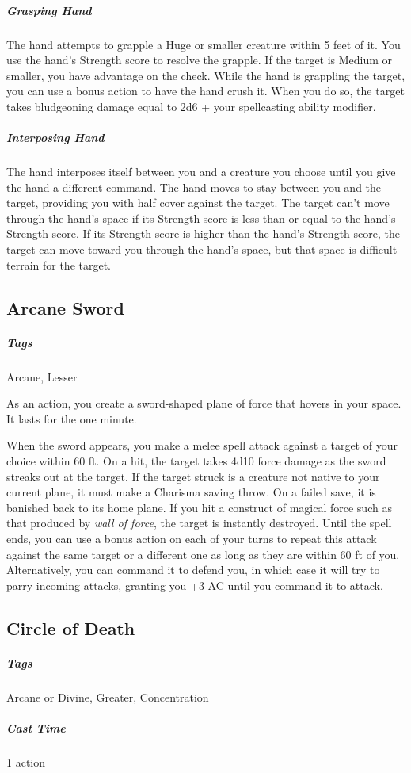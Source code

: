 \subparagraph*{Grasping Hand} The hand attempts to grapple a Huge or smaller creature within 5 feet of it. You use the hand's Strength score to resolve the grapple. If the target is Medium or smaller, you have advantage on the check. While the hand is grappling the target, you can use a bonus action to have the hand crush it. When you do so, the target takes bludgeoning damage equal to 2d6 + your spellcasting ability modifier.

\subparagraph*{Interposing Hand} The hand interposes itself between you and a creature you choose until you give the hand a different command. The hand moves to stay between you and the target, providing you with half cover against the target. The target can't move through the hand's space if its Strength score is less than or equal to the hand's Strength score. If its Strength score is higher than the hand's Strength score, the target can move toward you through the hand's space, but that space is difficult terrain for the target.

\subsection{Arcane Sword\label{spell:arcane-sword}}

\subparagraph*{Tags} Arcane, Lesser

As an action, you create a sword-shaped plane of force that hovers in your space. It lasts for the one minute.

When the sword appears, you make a melee spell attack against a target of your choice within 60 ft. On a hit, the target takes 4d10 force damage as the sword streaks out at the target. If the target struck is a creature not native to your current plane, it must make a Charisma saving throw. On a failed save, it is banished back to its home plane. If you hit a construct of magical force such as that produced by \textit{wall of force}, the target is instantly destroyed. Until the spell ends, you can use a bonus action on each of your turns to repeat this attack against the same target or a different one as long as they are within 60 ft of you. Alternatively, you can command it to defend you, in which case it will try to parry incoming attacks, granting you +3 AC until you command it to attack.

\subsection{Circle of Death\label{spell:circle-of-death}}
\subparagraph*{Tags} Arcane or Divine, Greater, Concentration
\subparagraph*{Cast Time} 1 action

